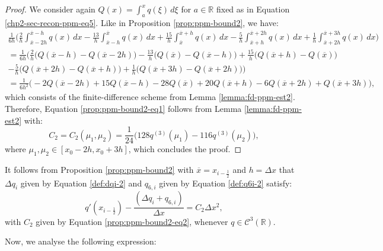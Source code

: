 \begin{proof}
	We consider again $Q(x) = \int_{a}^{x} q(\xi) \,d\xi$ for $a \in \mathbb{R}$ fixed as in 
	Equation \eqref{chp2-sec-recon-ppm-eq5}. 
	Like in Proposition \ref{prop:ppm-bound2}, we have:
	\begin{align*}
		\frac{1}{6h}
		\bigg( \frac{2}{h} \int_{\overline{x}-2h}^{\overline{x}-h} q(x) \,dx 
		-\frac{13}{h}\int_{\overline{x}-h}^{\overline{x}} q(x) \,dx   
		+\frac{15}{h}\int_{\overline{x}}^{\overline{x}+h} q(x) \,dx 
		-\frac{5}{h} \int_{\overline{x}+h}^{\overline{x}+2h} q(x) \,dx   
		+\frac{1}{h} \int_{\overline{x}+2h}^{\overline{x}+3h} q(x) \,dx   
		\bigg)\\
		= \frac{1}{6h} \bigg(
		\frac{2}{h}   \big( Q(\overline{x}-h)- Q(\overline{x}-2h)\big) 
		-\frac{13}{h} \big( Q(\overline{x}) - Q(\overline{x}-h) \big) 
		+\frac{15}{h} \big( Q(\overline{x}+h) - Q(\overline{x})  \big) \\
		-\frac{5}{h}  \big( Q(\overline{x}+2h) - Q(\overline{x}+h)  \big) 
		+\frac{1}{h}  \big( Q(\overline{x}+3h) - Q(\overline{x}+2h)  \big) 
		\bigg)\\
		= \frac{1}{6h^2}\bigg(-2Q(\overline{x}-2h) + 15Q(\overline{x}-h) - 28Q(\overline{x}) 
		+20Q(\overline{x}+h) -6Q(\overline{x}+2h) + Q(\overline{x}+3h)  \bigg),
	\end{align*}
	which consists of the finite-difference scheme from Lemma \ref{lemma:fd-ppm-est2}. 
	Therefore, Equation \eqref{prop:ppm-bound2-eq1} follows from Lemma \ref{lemma:fd-ppm-est2} with:
	\begin{equation}
		\label{prop:ppm-bound2-eq2}
		C_2 = C_2(\mu_1,\mu_2) = \frac{1}{24}\bigg(128q^{(3)}(\mu_{1}) - 116q^{(3)}(\mu_{2})\bigg), 
	\end{equation}
	where $\mu_{1}, \mu_{2} \in [x_0-2h,x_0+3h]$, which concludes the proof.
\end{proof}
\begin{corollary}
	\label{prop:ppm-bound2-corollary}
	It follows from Proposition \ref{prop:ppm-bound2} with $\overline{x} = x_{i-\frac{1}{2}}$
	and $h = \Delta x$ that $\Delta q_i$ given by Equation \eqref{def:dqi-2} 
	and $q_{6,i}$ given by Equation \eqref{def:q6i-2} satisfy:
	\begin{equation}
		q'(x_{i-\frac{1}{2}})-\frac{(\Delta q_i + q_{6, i})}{\Delta x}  = C_2\Delta x^2,
	\end{equation}
	with $C_2$ given by Equation \eqref{prop:ppm-bound2-eq2}, whenever $q \in \mathcal{C}^3(\mathbb{R})$.
\end{corollary}
Now, we analyse the following expression:
